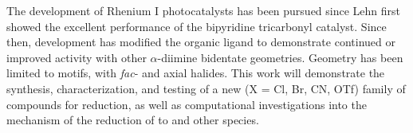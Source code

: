 The development of Rhenium I photocatalysts has been pursued since Lehn first showed the excellent performance of the  bipyridine tricarbonyl catalyst. Since then, development has modified the organic ligand to demonstrate continued or improved activity with other $\alpha$-diimine bidentate geometries. Geometry has been limited to  motifs, with \textit{fac}- and axial halides. This work will demonstrate the synthesis, characterization, and testing of a new  (X = Cl, Br, CN, OTf) family of compounds for  reduction, as well as computational investigations into the mechanism of the reduction of  to  and other species.
